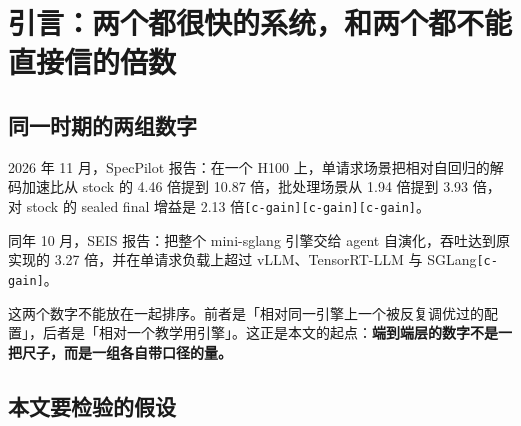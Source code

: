 \begin{abstract}
\textbf{第四，端到端层的主要风险不是搜不到，而是测不准。} 稻草人基线、绝对值不可迁移、任务饱和、基础设施缺陷四种失效模式，都会让循环「学到」一个不存在的改进{\scriptsize\texttt{[c-\hspace{0pt}measure]}}。而机制本身还会反号：批处理下 24 节点树在 FP8 目标上掉 14.9\%，24 位置块在 BF16 上掉 9.9\%，TLV 掉 13\%{\scriptsize\texttt{[c-\hspace{0pt}boundary]}}。


\textbf{结论：端到端层目前是「判据已经工程化的自动优化」，不是递归自我改进。} 可累积的部分是机制级的记忆条目，不是权重；而脚手架自改进的实证只有「7 次可评估改动里 3 次有效、4 次无效」{\scriptsize\texttt{[c-\hspace{0pt}harness]}}。


\textbf{关键词}：推理系统；投机解码；自我改进；反馈信号；无损判定；测量可信；端到端收益


\end{abstract}
\section{引言：两个都很快的系统，和两个都不能直接信的倍数}

\subsection{同一时期的两组数字}

2026 年 11 月，SpecPilot 报告：在一个 H100 上，单请求场景把相对自回归的解码加速比从 stock 的 4.46 倍提到 10.87 倍，批处理场景从 1.94 倍提到 3.93 倍，对 stock 的 sealed final 增益是 2.13 倍{\scriptsize\texttt{[c-\hspace{0pt}gain]}}{\scriptsize\texttt{[c-\hspace{0pt}gain]}}{\scriptsize\texttt{[c-\hspace{0pt}gain]}}。


同年 10 月，SEIS 报告：把整个 mini-sglang 引擎交给 agent 自演化，吞吐达到原实现的 3.27 倍，并在单请求负载上超过 vLLM、TensorRT-LLM 与 SGLang{\scriptsize\texttt{[c-\hspace{0pt}gain]}}。


这两个数字不能放在一起排序。前者是「相对同一引擎上一个被反复调优过的配置」，后者是「相对一个教学用引擎」。这正是本文的起点：\textbf{端到端层的数字不是一把尺子，而是一组各自带口径的量。}


\subsection{本文要检验的假设}

